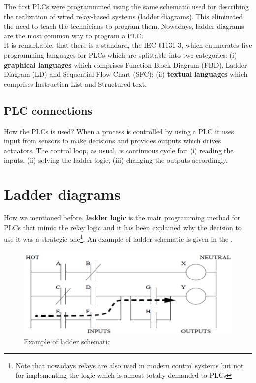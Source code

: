 The first PLCs were programmmed using the same schematic used for describing the realization of wired relay-based systems (ladder diagrams). This eliminated the need to teach the technicians to program them. Nowadays, ladder diagrams are the most common way to program a PLC. \\
It is remarkable, that there is a standard, the IEC 61131-3, which enumerates five programming languages for PLCs which are splittable into two categories: (i) \textbf{graphical languages} which comprises Function Block Diagram (FBD), Ladder Diagram (LD) and Sequential Flow Chart (SFC); (ii) \textbf{textual languages} which comprises Instruction List and Structured text.

\subsection{PLC connections}
How the PLCs is used? When a process is controlled by using a PLC it uses input from sensors to make decisions and provides outputs which drives actuators. The control loop, as usual, is continuous cycle for: (i) reading the  inputs, (ii) solving the ladder logic, (iii) changing the outputs accordingly.

\section{Ladder diagrams}  
How we mentioned before, \textbf{ladder logic} is the main programming method for PLCs that mimic the relay logic and it has been explained why the decision to use it was a strategic one\footnote{Note that nowadays relays are also used in modern control systems but not for implementing the logic which is almost totally demanded to PLCs}.
An example of ladder schematic is given in the .

\begin{figure}[h]
    \centering
    \includegraphics[scale=0.5]{img/sample.png}
    \caption{Example of ladder schematic}
    \label{fig:ladder}
\end{figure}

